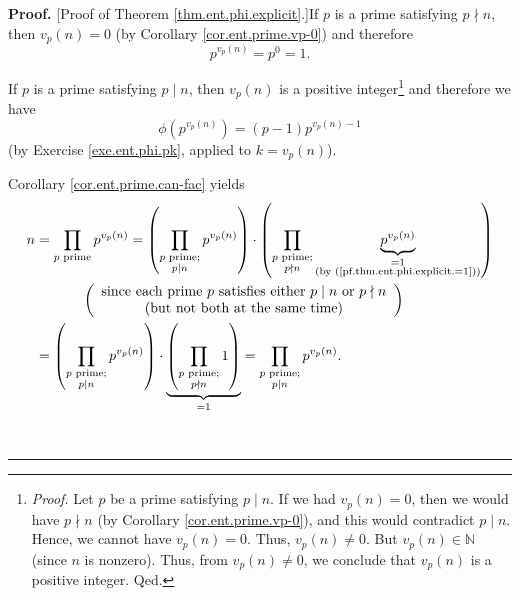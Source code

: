 \documentclass[numbers=enddot,12pt,final,onecolumn,notitlepage]{scrartcl}%
\numberwithin{exer}{subsection}
\theoremstyle{definition}
\newenvironment{proof}[1][Proof]{\noindent\textbf{#1.} }{\ \rule{0.5em}{0.5em}}
\let\prodnonlimits\prod
\renewcommand{\prod}{\prodnonlimits\limits}
\begin{document}
\begin{proof}
[Proof of Theorem \ref{thm.ent.phi.explicit}.]If $p$ is a prime satisfying
$p\nmid n$, then $v_{p}\left(  n\right)  =0$ (by Corollary
\ref{cor.ent.prime.vp-0}) and therefore
\begin{equation}
p^{v_{p}\left(  n\right)  }=p^{0}=1. \label{pf.thm.ent.phi.explicit.=1}%
\end{equation}


If $p$ is a prime satisfying $p\mid n$, then $v_{p}\left(  n\right)  $ is a
positive integer\footnote{\textit{Proof.} Let $p$ be a prime satisfying $p\mid
n$. If we had $v_{p}\left(  n\right)  =0$, then we would have $p\nmid n$ (by
Corollary \ref{cor.ent.prime.vp-0}), and this would contradict $p\mid n$.
Hence, we cannot have $v_{p}\left(  n\right)  =0$. Thus, $v_{p}\left(
n\right)  \neq0$. But $v_{p}\left(  n\right)  \in\mathbb{N}$ (since $n$ is
nonzero). Thus, from $v_{p}\left(  n\right)  \neq0$, we conclude that
$v_{p}\left(  n\right)  $ is a positive integer. Qed.} and therefore we have%
\begin{equation}
\phi\left(  p^{v_{p}\left(  n\right)  }\right)  =\left(  p-1\right)
p^{v_{p}\left(  n\right)  -1} \label{pf.thm.ent.phi.explicit.=p-1}%
\end{equation}
(by Exercise \ref{exe.ent.phi.pk}, applied to $k=v_{p}\left(  n\right)  $).

Corollary \ref{cor.ent.prime.can-fac} yields%
\begin{align}
n  &  =\prod_{p\text{ prime}}p^{v_{p}\left(  n\right)  }=\left(
\prod_{\substack{p\text{ prime;}\\p\mid n}}p^{v_{p}\left(  n\right)  }\right)
\cdot\left(  \prod_{\substack{p\text{ prime;}\\p\nmid n}}\underbrace{p^{v_{p}%
\left(  n\right)  }}_{\substack{=1\\\text{(by
(\ref{pf.thm.ent.phi.explicit.=1}))}}}\right) \nonumber\\
&  \ \ \ \ \ \ \ \ \ \ \left(
\begin{array}
[c]{c}%
\text{since each prime }p\text{ satisfies either }p\mid n\text{ or }p\nmid n\\
\text{(but not both at the same time)}%
\end{array}
\right) \nonumber\\
&  =\left(  \prod_{\substack{p\text{ prime;}\\p\mid n}}p^{v_{p}\left(
n\right)  }\right)  \cdot\underbrace{\left(  \prod_{\substack{p\text{
prime;}\\p\nmid n}}1\right)  }_{=1}=\prod_{\substack{p\text{ prime;}\\p\mid
n}}p^{v_{p}\left(  n\right)  }. \label{pf.thm.ent.phi.explicit.2}%
\end{align}



\end{proof}
\end{document}
